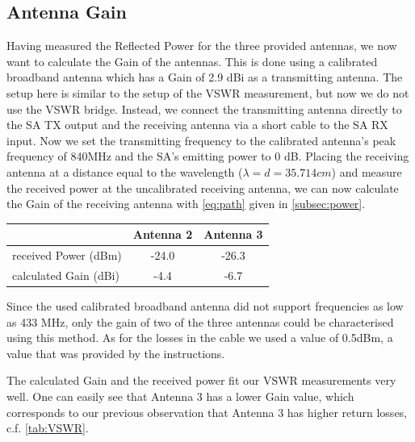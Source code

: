 \subsection{Antenna Gain}
Having measured the Reflected Power for the three provided antennas, we now want to calculate the Gain of the antennas. This is done using a calibrated broadband antenna which has a Gain of 2.9 dBi as a transmitting antenna. The setup here is similar to the setup of the VSWR measurement, but now we do not use the VSWR bridge. Instead, we connect the transmitting antenna directly to the SA TX output and the receiving antenna via a short cable to the SA RX input. Now we set the transmitting frequency to the calibrated antenna's peak frequency of 840MHz and the SA's emitting power to 0 dB. Placing the receiving antenna at a distance equal to the wavelength ($\lambda = d = 35.714cm$) and measure the received power at the uncalibrated receiving antenna, we can now calculate the Gain of the receiving antenna with \cref{eq:path} given in \cref{subsec:power}.

\begin{center}
	\begin{tabular}{l | c | c}
		& \textbf{Antenna 2} & \textbf{Antenna 3} \\ \hline
		received Power (dBm) & -24.0 &  -26.3\\ \hline
		calculated Gain (dBi) & -4.4 & -6.7 \\
	\end{tabular}
	\label{tab:gain}
\end{center}
Since the used calibrated broadband antenna did not support frequencies as low as 433 MHz, only the gain of two of the three antennas could be characterised using this method.
As for the losses in the cable we used a value of 0.5dBm, a value that was provided by the instructions.

The calculated Gain and the received power fit our VSWR measurements very well. One can easily see that Antenna 3 has a lower Gain value, which corresponds to our previous observation that Antenna 3 has higher return losses, c.f. \cref{tab:VSWR}.

